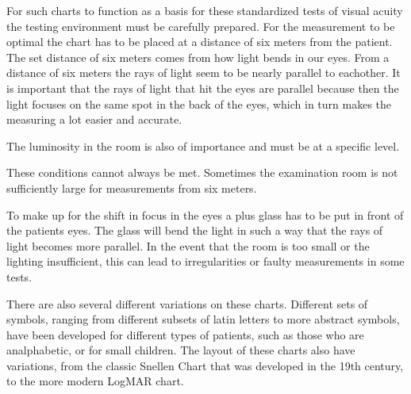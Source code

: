\documentclass[12pt,a4paper,notitlepage]{report}
\begin{document}

For such charts to function as a basis for these standardized tests of visual acuity the testing environment must be carefully prepared. For the measurement to be optimal the chart has to be placed at a distance of six meters from the patient. The set distance of six meters comes from how light bends in our eyes. From a distance of six meters the rays of light seem to be nearly parallel to eachother. %
It is important that the rays of light that hit the eyes are parallel because then the light focuses on the same spot in the back of the eyes, which in turn makes the measuring a lot easier and accurate. 

The luminosity in the room is also of importance and must be at a specific level. 

These conditions cannot always be met. Sometimes the examination room is not sufficiently large for measurements from six meters. %

To make up for the shift in focus in the eyes a plus glass has to be put in front of the patients eyes. The glass will bend the light in such a way that the rays of light becomes more parallel. In the event that the room is too small or the lighting insufficient, this can lead to irregularities or faulty measurements in some tests. 


There are also several different variations on these charts. Different sets of symbols, ranging from different subsets of latin letters to more abstract symbols, have been developed for different types of patients, such as those who are analphabetic, or for small children. The layout of these charts also have variations, from the classic Snellen Chart that was developed in the 19th century, to the more modern LogMAR chart.
\end{document}
